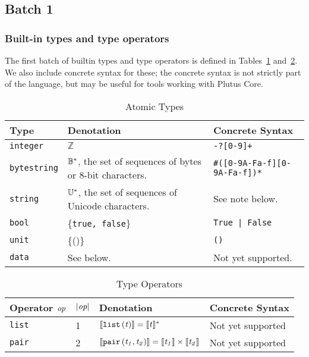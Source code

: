 \newcommand{\note}[1]{
  \bigskip
  \refstepcounter{notenumberA}
  \noindent\textbf{Note \thenotenumberA. #1}
}

\newcommand{\utfeight}{\mathsf{utf8}}
\newcommand{\unutfeight}{\mathsf{utf8}^{-1}}
\newcommand{\vk}{\textit{vk}}  %

\subsection{Batch 1}
\label{sec:default-builtins-1}

\subsubsection{Built-in types and type operators}
\label{sec:built-in-types-1}
The first batch of builtin types and type operators is defined in Tables~\ref{table:built-in-types-1}
and~\ref{table:built-in-type-operators-1}.  We also include concrete syntax for
these; the concrete syntax is not strictly part of the language, but may be
useful for tools working with Plutus Core.

\begin{table}[H]
  \centering
    \begin{tabular}{|l|p{6cm}|l|}
        \hline
        Type & Denotation & Concrete Syntax\\
        \hline
        \texttt{integer} &   $\mathbb{Z}$ & \texttt{-?[0-9]+}\\
        \texttt{bytestring}  & $ \mathbb{B}^*$, the set of sequences of bytes or 8-bit characters. & \texttt{\#([0-9A-Fa-f][0-9A-Fa-f])*}\\
        \texttt{string} & $\mathbb{U}^*$,  the set of sequences of Unicode characters. & See note below.\\
        \texttt{bool} & \{\texttt{true, false}\} & \texttt{True | False}\\
        \texttt{unit} &  \{()\} & \texttt{()}\\
        \texttt{data} &  See below. & Not yet supported.\\
        \hline
    \end{tabular}
    \caption{Atomic Types}
    \label{table:built-in-types-1}
\end{table}

\begin{table}[H]
  \centering
    \begin{tabular}{|l|p{14mm}|l|l|}
        \hline
        Operator $\textit{op}$ & $\left|\textit{op}\right|$  & Denotation & Concrete Syntax\\
        \hline
        \texttt{list} & 1 & $\llbracket\mathit{\mathtt{list}\,\mathtt{(}t\mathtt{)}}\rrbracket = \llbracket\mathit{t}\rrbracket^*$ & Not yet supported\\
        \texttt{pair} & 2 & $\llbracket\mathit{\mathtt{pair}\,\mathtt{(}t_1\mathtt{,}\,t_2\mathtt{)}}\rrbracket = \llbracket\mathit{t_1}\rrbracket \times \llbracket\mathit{t_2}\rrbracket$ & Not yet supported\\
        \hline
        \end{tabular}
   \caption{Type Operators}
    \label{table:built-in-type-operators-1}
\end{table}

